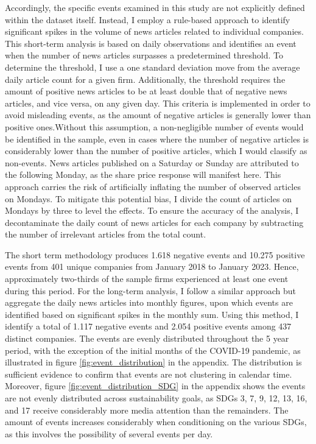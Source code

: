 Accordingly, the specific events examined in this study are not explicitly defined within the dataset itself. Instead, I employ a rule-based approach to identify significant spikes in the volume of news articles related to individual companies. This short-term analysis is based on daily observations and identifies an event when the number of news articles surpasses a predetermined threshold. To determine the threshold, I use a one standard deviation move from the average daily article count for a given firm. Additionally, the threshold requires the amount of positive news articles to be at least double  that of negative news articles, and vice versa, on any given day. This criteria is implemented in order to avoid misleading events, as the amount of negative articles is generally lower than positive ones.Without this assumption, a non-negligible number of events would be identified in the sample, even in cases where the number of negative articles is considerably lower than the number of positive articles, which I would classify as non-events. News articles published on a Saturday or Sunday are attributed to the following Monday, as the share price response will manifest here. This approach carries the risk of artificially inflating the number of observed articles on Mondays. To mitigate this potential bias, I divide the count of articles on Mondays by three to level the effects. To ensure the accuracy of the analysis, I decontaminate the daily count of news articles for each company by subtracting the number of irrelevant articles from the total count. 

The short term methodology produces 1.618 negative events and 10.275 positive events from 401 unique companies from January 2018 to January 2023. Hence, approximately two-thirds of the sample firms experienced at least one event during this period. For the long-term analysis, I follow a similar approach but aggregate the daily news articles into monthly figures, upon which events are identified based on significant spikes in the monthly sum. Using this method, I identify a total of 1.117 negative events and 2.054 positive events among 437 distinct companies. The events are evenly distributed throughout the 5 year period, with the exception of the initial months of the COVID-19 pandemic, as illustrated in figure \ref{fig:event_distribution} in the appendix. The distribution is sufficient evidence to confirm that events are not clustering in calendar time. Moreover, figure \ref{fig:event_distribution_SDG} in the appendix shows the events are not evenly distributed across sustainability goals, as SDGs 3, 7, 9, 12, 13, 16, and 17 receive considerably more media attention than the remainders. The amount of events increases considerably when conditioning on the various SDGs, as this involves the possibility of several events per day. 

